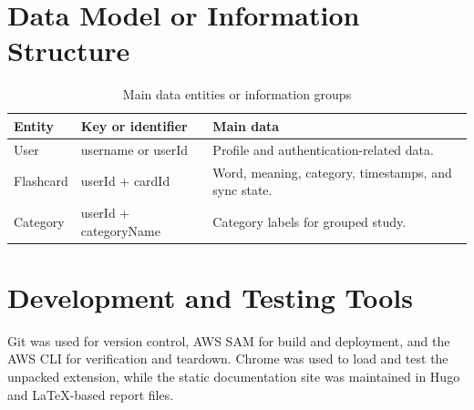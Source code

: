 \section{Data Model or Information Structure}

\begin{table}[H]
  \centering
  \caption{Main data entities or information groups}
  \begin{tabularx}{\textwidth}{@{}P{3.3cm}P{4.7cm}Y@{}}
    \toprule
    \textbf{Entity} & \textbf{Key or identifier} & \textbf{Main data} \\
    \midrule
    User & username or userId & Profile and authentication-related data. \\
    Flashcard & userId + cardId & Word, meaning, category, timestamps, and
    sync state. \\
    Category & userId + categoryName & Category labels for grouped study. \\
    \bottomrule
  \end{tabularx}
\end{table}

\section{Development and Testing Tools}

Git was used for version control, AWS SAM for build and deployment, and the
AWS CLI for verification and teardown. Chrome was used to load and test the
unpacked extension, while the static documentation site was maintained in Hugo
and LaTeX-based report files.